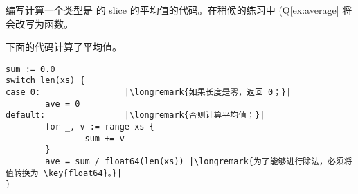 \begin{Exercise}[title={Average},difficulty=4]
\label{ex:average no func}
\Question\label{ex:average no func q1} 编写计算一个类型是
 的 slice 的平均值的代码。在稍候的练习中 (Q\ref{ex:average} 
将会改写为函数。
\end{Exercise}

\begin{Answer}
\Question 下面的代码计算了平均值。
\begin{lstlisting}
sum := 0.0 
switch len(xs) {
case 0:                 |\longremark{如果长度是零，返回 0；}|
        ave = 0
default:                |\longremark{否则计算平均值；}|
        for _, v := range xs {
                sum += v
        }
        ave = sum / float64(len(xs)) |\longremark{为了能够进行除法，必须将值转换为 \key{float64}。}|
}
\end{lstlisting}
\showremarks
\end{Answer}
